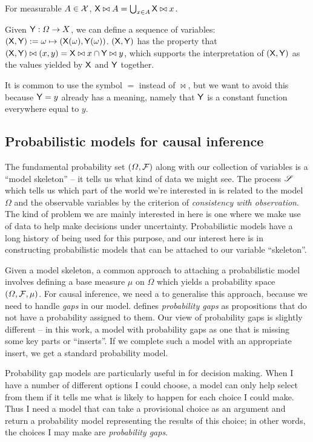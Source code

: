 For measurable $A\in \mathcal{X}$, $\mathsf{X}\bowtie A=\bigcup_{x\in A} \mathsf{X}\bowtie x$. 

Given $\mathsf{Y}:\Omega\to X$, we can define a sequence of variables: $(\mathsf{X},\mathsf{Y}):=\omega\mapsto (\mathsf{X}(\omega),\mathsf{Y}(\omega))$. $(\mathsf{X},\mathsf{Y})$ has the property that $(\mathsf{X},\mathsf{Y})\bowtie (x,y)= \mathsf{X}\bowtie x\cap \mathsf{Y}\bowtie y$, which supports the interpretation of $(\mathsf{X},\mathsf{Y})$ as the values yielded by $\mathsf{X}$ and $\mathsf{Y}$ together.

It is common to use the symbol $=$ instead of $\bowtie$, but we want to avoid this because $\mathsf{Y}=y$ already has a meaning, namely that $\mathsf{Y}$ is a constant function everywhere equal to $y$. 

\subsection{Probabilistic models for causal inference}

The fundamental probability set $(\Omega,\mathcal{F})$ along with our collection of variables is a ``model skeleton'' -- it tells us what kind of data we might see. The process $\mathscr{S}$ which tells us which part of the world we're interested in is related to the model $\Omega$ and the observable variables by the criterion of \emph{consistency with observation}. The kind of problem we are mainly interested in here is one where we make use of data to help make decisions under uncertainty. Probabilistic models have a long history of being used for this purpose, and our interest here is in constructing probabilistic models that can be attached to our variable ``skeleton''. 

Given a model skeleton, a common approach to attaching a probabilistic model involves defining a base measure $\mu$ on $\Omega$ which yields a probability space $(\Omega,\mathcal{F},\mu)$. For causal inference, we need a to generalise this approach, because we need to handle \emph{gaps} in our model. \citet{hajek_what_2003} defines \emph{probability gaps} as propositions that do not have a probability assigned to them. Our view of probability gaps is slightly different -- in this work, a model with probability gaps as one that is missing some key parts or ``inserts''. If we complete such a model with an appropriate insert, we get a standard probability model.

Probability gap models are particularly useful in for decision making. When I have a number of different options I could choose, a model can only help select from them if it tells me what is likely to happen for each choice I could make. Thus I need a model that can take a provisional choice as an argument and return a probability model representing the results of this choice; in other words, the choices I may make are \emph{probability gaps}.

